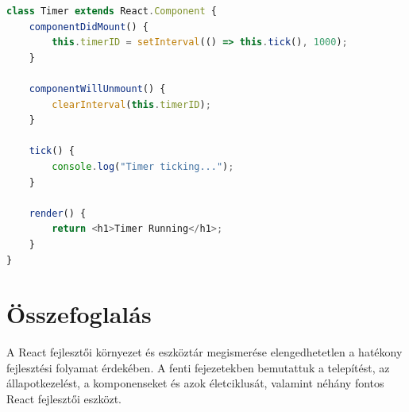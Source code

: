 \documentclass[colorlinks]{thesis-kando}
\theoremstyle{definition}
\theoremstyle{remark}
\begin{document}
\begin{lstlisting}[language=JavaScript]
class Timer extends React.Component {
    componentDidMount() {
        this.timerID = setInterval(() => this.tick(), 1000);
    }

    componentWillUnmount() {
        clearInterval(this.timerID);
    }

    tick() {
        console.log("Timer ticking...");
    }

    render() {
        return <h1>Timer Running</h1>;
    }
}
\end{lstlisting}

\section{Összefoglalás}
A React fejlesztői környezet és eszköztár megismerése elengedhetetlen a hatékony fejlesztési folyamat érdekében. A fenti fejezetekben bemutattuk a telepítést, az állapotkezelést, a komponenseket és azok életciklusát, valamint néhány fontos React fejlesztői eszközt.
\end{document}
